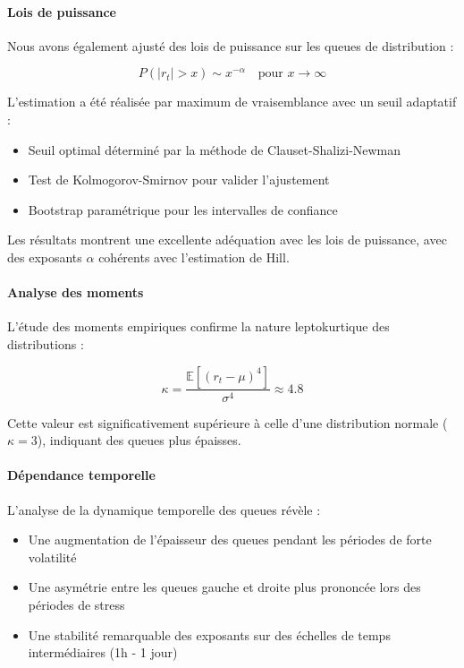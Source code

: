 \documentclass[12pt,a4paper]{article}
\theoremstyle{definition}
\theoremstyle{remark}
\begin{document}
\paragraph{Lois de puissance}
Nous avons également ajusté des lois de puissance sur les queues de distribution :

\begin{equation}
P(|r_t| > x) \sim x^{-\alpha} \quad \text{pour } x \to \infty
\end{equation}

L'estimation a été réalisée par maximum de vraisemblance avec un seuil adaptatif :

\begin{itemize}
    \item Seuil optimal déterminé par la méthode de Clauset-Shalizi-Newman
    \item Test de Kolmogorov-Smirnov pour valider l'ajustement
    \item Bootstrap paramétrique pour les intervalles de confiance
\end{itemize}

Les résultats montrent une excellente adéquation avec les lois de puissance, avec des exposants $\alpha$ cohérents avec l'estimation de Hill.

\paragraph{Analyse des moments}
L'étude des moments empiriques confirme la nature leptokurtique des distributions :

\begin{equation}
\kappa = \frac{\mathbb{E}[(r_t - \mu)^4]}{\sigma^4} \approx 4.8
\end{equation}

Cette valeur est significativement supérieure à celle d'une distribution normale ($\kappa = 3$), indiquant des queues plus épaisses.

\paragraph{Dépendance temporelle}
L'analyse de la dynamique temporelle des queues révèle :

\begin{itemize}
    \item Une augmentation de l'épaisseur des queues pendant les périodes de forte volatilité
    \item Une asymétrie entre les queues gauche et droite plus prononcée lors des périodes de stress
    \item Une stabilité remarquable des exposants sur des échelles de temps intermédiaires (1h - 1 jour)
\end{itemize}
\end{document}
